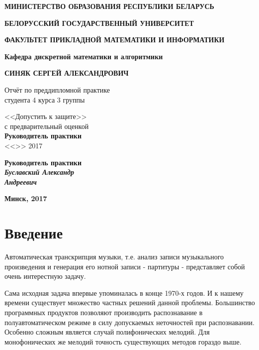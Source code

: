 \documentclass[oneside, final, 12pt]{extarticle}
\begin{document}
\begin{titlepage}


\centerline{\bf МИНИСТЕРСТВО ОБРАЗОВАНИЯ РЕСПУБЛИКИ БЕЛАРУСЬ}
\bigskip
\bigskip
\centerline{\bf БЕЛОРУССКИЙ ГОСУДАРСТВЕННЫЙ УНИВЕРСИТЕТ}
\bigskip
\bigskip
\centerline{\bf ФАКУЛЬТЕТ ПРИКЛАДНОЙ МАТЕМАТИКИ И ИНФОРМАТИКИ}
\bigskip
\bigskip
\centerline{\bf Кафедра дискретной математики и алгоритмики}
\vfill
\vfill
\vfill
\centerline{\bf СИНЯК СЕРГЕЙ АЛЕКСАНДРОВИЧ}
\bigskip
\bigskip
{}
\vfill
\begin{centering}
  {Отчёт по преддипломной практике \\
  студента 4 курса 3 группы}
\end{centering}
\vfill
\vfill
\begin{minipage}{0.45\textwidth}
  \raggedright
  {<<Допустить к защите>>\\
  с предварительный оценкой \underline{\hspace{3cm}}\\
  {\bf Руководитель практики}\\
  \bigskip
  <<\quad>> \hspace{3cm} 2017
  }
\end{minipage}
\hfill
\noindent
\begin{minipage}{0.45\textwidth}
  \raggedright
  {\bf Руководитель практики \\
  {\small{\it Буславский Александр \\ Андреевич}}}
\end{minipage}
\vfill
\vfill
\centerline{\large \bf Минск, 2017}

\restoregeometry

\end{titlepage}

\setcounter{page}{2}

\tableofcontents

\cleardoublepage

\section{Введение}
  Автоматическая транскрипция музыки, т.е. анализ записи музыкального
  произведения и генерация его нотной записи - партитуры -
  представляет собой очень интерестную задачу.

  Сама исходная задача впервые упоминалась в конце 1970-х годов. И к нашему
  времени существует множество частных решений данной проблемы. Большинство
  программных продуктов позволяют производить распознавание в
  полуавтоматическом режиме в силу допускаемых неточностей при распознавании.
  Особенно сложным является случай полифонических мелодий.  Для
  монофонических же мелодий точность существующих методов гораздо выше.
\end{document}
